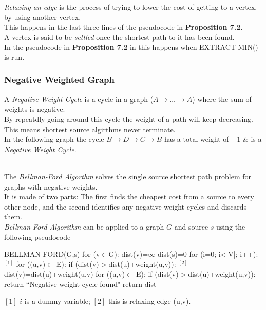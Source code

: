 \documentclass[11pt,a4paper]{article}
\begin{document}
\newpage
{}
\textit{Relaxing an edge} is the process of trying to lower the cost of getting to a vertex, by using another vertex.\\
\nb This happens in the last three lines of the pseudocode in \textbf{Proposition 7.2}.\\

A vertex is said to be \textit{settled} once the shortest path to it has been found.\\
\nb In the pseudocode in \textbf{Proposition 7.2} in this happens when EXTRACT-MIN() is run.

\subsubsection{Negative Weighted Graph}

A \textit{Negative Weight Cycle} is a cycle in a graph ($A\to\dots\to A$) where the sum of weights is negative.\\
By repeatdly going around this cycle the weight of a path will keep decreasing.\\
This means shortest source algirthms never terminate.\\

In the following graph the cycle $B\to D\to C\to B$ has a total weight of $-1$ \& is a \textit{Negative Weight Cycle}.\\
\\

The \textit{Bellman-Ford Algorthm} solves the single source shortest path problem for graphs with negative weights.\\
It is made of two parts: The first finds the cheapest cost from a source to every other node, and the second identifies any negative weight cycles and discards them.\\
\textit{Bellman-Ford Algorithm} can be applied to a graph $G$ and source $s$ using the following pseudocode
\begin{code}
BELLMAN-FORD(G,s)
for (v$\in$G):
  dist(v)=$\infty$
dist(s)=0
for (i=0; i<|V|; i++):$^{[1]}$
  for ((u,v)$\in$ E):
    if (dist(v)$>$dist(u)+weight(u,v)): $^{[2]}$
      dist(v)=dist(u)+weight(u,v)
for ((u,v)$\in$ E):
  if (dist(v)$>$dist(u)+weight(u,v)):
    return ``Negative weight cycle found"
return dist
\end{code}
$[1]$ $i$ is a dummy variable; $[2]$ this is relaxing edge (u,v).\\
\end{document}
